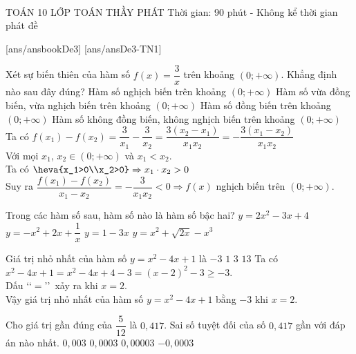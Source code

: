 ﻿﻿﻿﻿\begin{name}
	{\tenchude}
	{TOÁN 10}
	{LỚP TOÁN THẦY PHÁT}
	{Thời gian: 90 phút - Không kể thời gian phát đề}
\end{name}
[ans/ansbookDe3]
\TN
{}[ans/ansDe3-TN1]
\begin{ex}%
	Xét sự biến thiên của hàm số $f(x)=\dfrac{3}{x}$ trên khoảng $(0 ;+\infty)$. Khẳng định nào sau đây đúng?
	\choice
	{\True Hàm số nghịch biến trên khoảng $(0 ;+\infty)$}
	{ Hàm số vừa đồng biến, vừa nghịch biến trên khoảng $(0 ;+\infty)$}
	{Hàm số đồng biến trên khoảng $(0 ;+\infty)$}
	{Hàm số không đồng biến, không nghịch biến trên khoảng $(0 ;+\infty)$}
	\loigiai
	{
		Ta có $f(x_1)-f(x_2)=\dfrac{3}{x_1}-\dfrac{3}{x_2}=\dfrac{3(x_2-x_1)}{x_1x_2}=-\dfrac{3(x_1-x_2)}{x_1x_2}$\\
		Với mọi $x_1$, $x_2\in (0 ;+\infty) $ và $x_1 < x_2$.\\
		Ta có $ \heva{x_1>0\\x_2>0} \Rightarrow x_1 \cdot x_2 >0$\\
		Suy ra $ \dfrac{f(x_1)-f(x_2)}{x_1-x_2}=-\dfrac{3}{x_1x_2}<0 \Rightarrow f(x)$ nghịch biến trên $(0 ;+\infty)$.
	}
\end{ex}

\begin{ex}%
	Trong các hàm số sau, hàm số nào là hàm số bậc hai?
	\choice
	{\True $y=2x^2-3x+4$}
	{$y=-x^2+2x+\dfrac{1}{x}$}
	{$y=1-3x$}
	{$y=x^2+\sqrt{2x}-x^3$}
\end{ex}

\begin{ex}%
	Giá trị nhỏ nhất của hàm số $y=x^2-4x+1$ là
	\choice
	{\True $-3$}
	{$1$}
	{$3$}
	{$13$}
	\loigiai
	{
		Ta có $x^2-4x+1=x^2-4x+4-3=(x-2)^2-3\geqslant-3$. \\
		Dấu \lq\lq$=$\rq\rq\ xảy ra khi $x=2$. \\
		Vậy giá trị nhỏ nhất của hàm số $y=x^2-4x+1$ bằng $-3$ khi $x=2$.
	}
\end{ex}

\begin{ex}%
	Cho giá trị gần đúng của $\dfrac{5}{12}$ là $0{,}417$. Sai số tuyệt đối của số $0{,}417$ gần với đáp án nào nhất.
	\choice
	{$0{,}003$}
	{\True $0{,}0003$}
	{$0{,}00003$}
	{$-0{,}0003$}
\end{ex}

